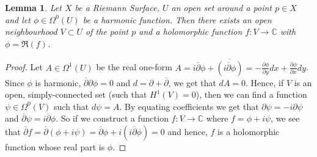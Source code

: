 \documentclass[11pt]{report}
\newtheorem{lemma}[thm]{Lemma}
\theoremstyle{definition}
\newtheorem{example}[thm]{Example}
\begin{document}
\begin{lemma}\label{HarmRealHol}
  Let $X$ be a Riemann Surface, $U$ an open set around a point $p \in X$ and let $\phi \in \Omega^0(U)$ be a harmonic function. Then there exists an open neighbourhood $V \subset U$ of the point $p$ and a holomorphic function $f \colon V \rightarrow \mathbb{C}$ with $\phi = \Re(f)$.
\end{lemma}
\begin{proof}
  Let $A \in \Omega^1(U)$ be the real one-form $A = i\overline{\partial}\phi + \overline{(i\overline{\partial}\phi)} = -\frac{\partial \phi}{\partial y} dx + \frac{\partial \phi}{\partial x} dy$. Since $\phi$ is harmonic, $\overline{\partial}\partial \phi = 0$ and $d = \partial + \overline{\partial}$, we get that $dA = 0$. Hence, if $V$ is an open, simply-connected set (such that $H^1(V)=0$), then we can find a function $\psi \in \Omega^0(V)$ such that $d\psi = A$. By equating coefficients we get that $\partial \psi = -i \partial \psi$ and $\overline{\partial} \psi = i \overline{\partial} \phi$. So if we construct a function $f \colon V \rightarrow \mathbb{C}$ where $f = \phi + i \psi$, we see that $\overline{\partial}f = \overline{\partial}(\phi + i\psi) = \overline{\partial}\phi +i(i\overline{\partial}\phi) = 0$ and hence, $f$ is a holomorphic function whose real part is $\phi$. 
\end{proof}


\end{document}
